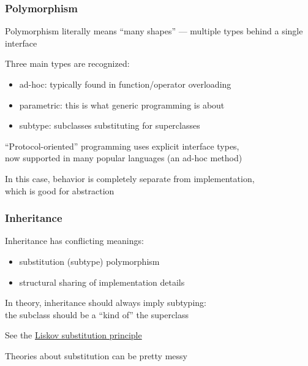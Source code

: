\documentclass[handout,compress,t,11pt]{beamer}
\begin{document}
\begin{frame}[fragile]
    \frametitle{Polymorphism}
    Polymorphism literally means ``many shapes'' --- multiple types behind
    a single interface \par
    \vspace{0.4\baselineskip}
    Three main types are recognized:
    \begin{itemize}
        \item ad-hoc: typically found in function/operator overloading
        \item parametric: this is what generic programming is about
        \item subtype: subclasses substituting for superclasses
    \end{itemize}
    \vspace{\baselineskip}
    ``Protocol-oriented'' programming uses explicit interface types,\\
    now supported in many popular languages (an ad-hoc method) \par
    \vspace{\baselineskip}
    In this case, behavior is completely separate from implementation,\\
    which is good for abstraction
\end{frame}

\begin{frame}[fragile]
    \frametitle{Inheritance}
    Inheritance has conflicting meanings:
    \begin{itemize}
        \item substitution (subtype) polymorphism
        \item structural sharing of implementation details
    \end{itemize}
    \vspace{\baselineskip}
    In theory, inheritance should always imply subtyping: \\the subclass should
    be a ``kind of'' the superclass \par
    \vspace{\baselineskip}
    See the \href{https://en.wikipedia.org/wiki/Liskov_substitution_principle}%
    {Liskov substitution principle} \par
    \vspace{\baselineskip}
    Theories about substitution can be pretty messy
\end{frame}
\end{document}
